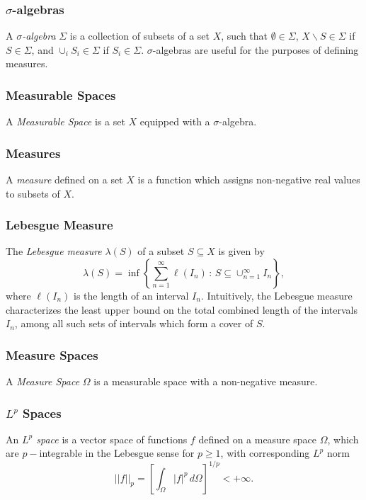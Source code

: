\subsubsection*{$\sigma$-algebras} A \textit{$\sigma$-algebra} $\Sigma$ is a collection of subsets of a set $X$, such that $\emptyset \in \Sigma$, $X \backslash S \in \Sigma$ if $S \in \Sigma$, and $\cup_i S_i \in \Sigma$ if $S_i \in \Sigma$. $\sigma$-algebras are useful for the purposes of defining measures.

\subsubsection*{Measurable Spaces} A \textit{Measurable Space} is a set $X$ equipped with a $\sigma$-algebra.

\subsubsection*{Measures} A \textit{measure} defined on a set $X$ is a function which assigns non-negative real values to subsets of $X$.

\subsubsection*{Lebesgue Measure} The \textit{Lebesgue measure} $\lambda(S)$ of a subset $S \subseteq X$ is given by
\begin{equation}
  \lambda (S) = \inf \left\{ \sum_{n = 1}^{\infty} \ell (I_n) \, : \, S \subseteq \cup_{n=1}^{\infty} I_n \right\},
\end{equation}
where $\ell (I_n)$ is the length of an interval $I_n$. Intuitively, the Lebesgue measure characterizes the least upper bound on the total combined length of the intervals $I_n$, among all such sets of intervals which form a cover of $S$.

\subsubsection*{Measure Spaces} A \textit{Measure Space} $\Omega$ is a measurable space with a non-negative measure.

\subsubsection*{$L^p$ Spaces} An \textit{$L^p$ space} is a vector space of functions $f$ defined on a measure space $\Omega$, which are $p-$integrable in the Lebesgue sense for $p \geq 1$, with corresponding $L^p$ norm 
\begin{equation}
  || f ||_{p} = \left[ \int_{\Omega} | f |^p \, d \Omega \right]^{1/p} < + \infty.
\end{equation}

